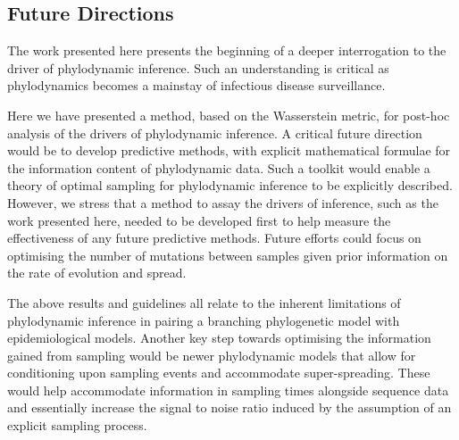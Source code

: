 \documentclass{article}
\begin{document}
\subsection*{Future Directions}
The work presented here presents the beginning of a deeper interrogation to the driver of phylodynamic inference. Such an understanding is critical as phylodynamics becomes a mainstay of infectious disease surveillance.

Here we have presented a method, based on the Wasserstein metric, for post-hoc analysis of the drivers of phylodynamic inference. A critical future direction would be to develop predictive methods, with explicit mathematical formulae for the information content of phylodynamic data. Such a toolkit would enable a theory of optimal sampling for phylodynamic inference to be explicitly described. However, we stress that a method to assay the drivers of inference, such as the work presented here, needed to be developed first to help measure the effectiveness of any future predictive methods. Future efforts could focus on optimising the number of mutations between samples given prior information on the rate of evolution and spread.



The above results and guidelines all relate to the inherent limitations of phylodynamic inference in pairing a branching phylogenetic model with epidemiological models. Another key step towards optimising the information gained from sampling would be newer phylodynamic models that allow for conditioning upon sampling events and accommodate super-spreading. These would help accommodate information in sampling times alongside sequence data and essentially increase the signal to noise ratio induced by the assumption of an explicit sampling process.

    
\end{document}
